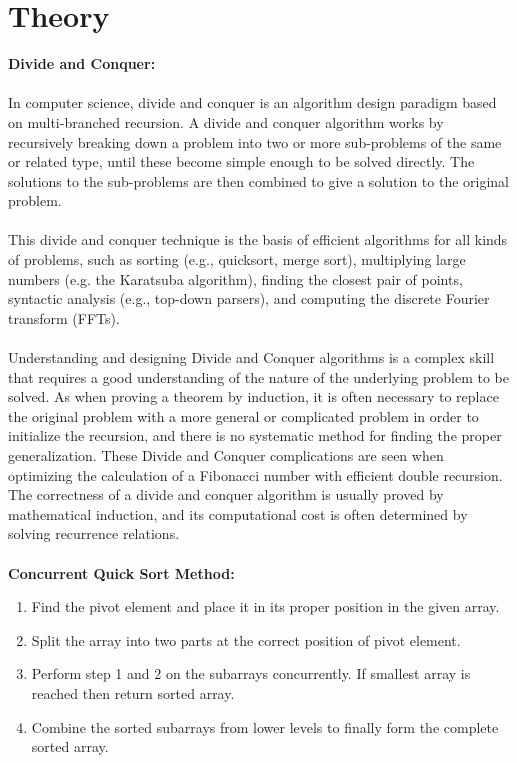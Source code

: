 \documentclass[10pt,a4paper]{article}
\begin{document}
\section{Theory}
\textbf{Divide and Conquer:}
\\\\
In computer science, divide and conquer is an algorithm design paradigm based on multi-branched recursion. A divide and conquer algorithm works by recursively breaking down a problem into two or more sub-problems of the same or related type, until these become simple enough to be solved directly. The solutions to the sub-problems are then combined to give a solution to the original problem.
\\\\This divide and conquer technique is the basis of efficient algorithms for all kinds of problems, such as sorting (e.g., quicksort, merge sort), multiplying large numbers (e.g. the Karatsuba algorithm), finding the closest pair of points, syntactic analysis (e.g., top-down parsers), and computing the discrete Fourier transform (FFTs).
\\\\Understanding and designing Divide and Conquer algorithms is a complex skill that requires a good understanding of the nature of the underlying problem to be solved. As when proving a theorem by induction, it is often necessary to replace the original problem with a more general or complicated problem in order to initialize the recursion, and there is no systematic method for finding the proper generalization. These Divide and Conquer complications are seen when optimizing the calculation of a Fibonacci number with efficient double recursion.
\\The correctness of a divide and conquer algorithm is usually proved by mathematical induction, and its computational cost is often determined by solving recurrence relations.
\\\\
\textbf{Concurrent Quick Sort Method:}
\begin{enumerate}
\item Find the pivot element and place it in its proper position in the given array.
\item Split the array into two parts at the correct position of pivot element.
\item Perform step 1 and 2 on the subarrays concurrently. If smallest array is reached then return sorted array.
\item Combine the sorted subarrays from lower levels to finally form the complete sorted array.
\end{enumerate}
\end{document}
